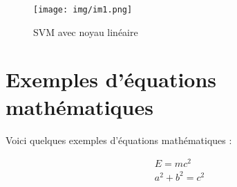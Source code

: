 \documentclass[a4paper,12pt]{article}
\begin{document}
\begin{figure}[ht]
    \centering
    \texttt{[image: img/im1.png]}
    \caption{SVM avec noyau linéaire}
\end{figure}

\section{Exemples d'équations mathématiques}
Voici quelques exemples d'équations mathématiques :

\begin{align}
    E = mc^2 \tag{1} \\
    a^2 + b^2 = c^2 \tag{2}
\end{align}

\newpage


\end{document}
